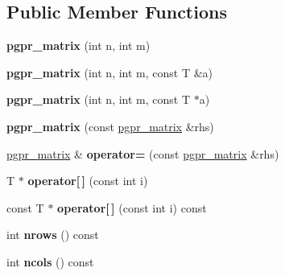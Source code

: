 \subsection*{Public Member Functions}
\begin{DoxyCompactItemize}
\item 
\hypertarget{classpgpr__matrix_a2451b575fd88d47571f9999c0dc39e9a}{{\bfseries pgpr\-\_\-matrix} (int n, int m)}\label{classpgpr__matrix_a2451b575fd88d47571f9999c0dc39e9a}

\item 
\hypertarget{classpgpr__matrix_a243a5073f945175408af24ed5d0c340f}{{\bfseries pgpr\-\_\-matrix} (int n, int m, const T \&a)}\label{classpgpr__matrix_a243a5073f945175408af24ed5d0c340f}

\item 
\hypertarget{classpgpr__matrix_a2cb9bc3c0ebf48e5153b56dd9519b129}{{\bfseries pgpr\-\_\-matrix} (int n, int m, const T $\ast$a)}\label{classpgpr__matrix_a2cb9bc3c0ebf48e5153b56dd9519b129}

\item 
\hypertarget{classpgpr__matrix_a43770fb668583996c6301467754e1d55}{{\bfseries pgpr\-\_\-matrix} (const \hyperlink{classpgpr__matrix}{pgpr\-\_\-matrix} \&rhs)}\label{classpgpr__matrix_a43770fb668583996c6301467754e1d55}

\item 
\hypertarget{classpgpr__matrix_afe2e87219c7a853905244b8ce1f7c29e}{\hyperlink{classpgpr__matrix}{pgpr\-\_\-matrix} \& {\bfseries operator=} (const \hyperlink{classpgpr__matrix}{pgpr\-\_\-matrix} \&rhs)}\label{classpgpr__matrix_afe2e87219c7a853905244b8ce1f7c29e}

\item 
\hypertarget{classpgpr__matrix_aa927ef3ca93939182c9d29c81623fb44}{T $\ast$ {\bfseries operator\mbox{[}$\,$\mbox{]}} (const int i)}\label{classpgpr__matrix_aa927ef3ca93939182c9d29c81623fb44}

\item 
\hypertarget{classpgpr__matrix_a2c4b2fc108046af40cbc8ec2716a3f53}{const T $\ast$ {\bfseries operator\mbox{[}$\,$\mbox{]}} (const int i) const }\label{classpgpr__matrix_a2c4b2fc108046af40cbc8ec2716a3f53}

\item 
\hypertarget{classpgpr__matrix_a7eb8e4706b5572e74efec76578129a71}{int {\bfseries nrows} () const }\label{classpgpr__matrix_a7eb8e4706b5572e74efec76578129a71}

\item 
\hypertarget{classpgpr__matrix_a54e645e13bd7f8f2a713f428c840a061}{int {\bfseries ncols} () const }\label{classpgpr__matrix_a54e645e13bd7f8f2a713f428c840a061}


\end{DoxyCompactItemize}
